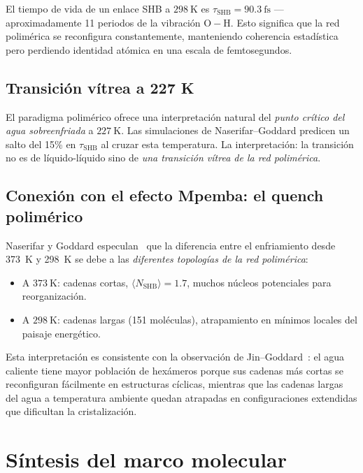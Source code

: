 \noindent El tiempo de vida de un enlace SHB a $\SI{298}{\kelvin}$ es 
$\tau_{\mathrm{SHB}} = \SI{90.3}{\femto\second}$ ---aproximadamente 11 periodos 
de la vibración $\mathrm{O{-}H}$. Esto significa que la red polimérica se 
reconfigura constantemente, manteniendo coherencia estadística pero perdiendo 
identidad atómica en una escala de femtosegundos.

\subsection{Transición vítrea a 227 K}

El paradigma polimérico ofrece una interpretación natural del \emph{punto 
crítico del agua sobreenfriada} a $\SI{227}{\kelvin}$. Las simulaciones de 
Naserifar--Goddard predicen un salto del 15\% en $\tau_{\mathrm{SHB}}$ al cruzar 
esta temperatura. La interpretación: la transición no es de líquido-líquido sino 
de \emph{una transición vítrea de la red polimérica}.

\subsection{Conexión con el efecto Mpemba: el quench polimérico}

Naserifar y Goddard especulan~\cite{naserifar2019} que la diferencia entre el 
enfriamiento desde \SI{373}{\kelvin} y \SI{298}{\kelvin} se debe a las 
\emph{diferentes topologías de la red polimérica}:

\begin{itemize}
\item A $\SI{373}{\kelvin}$: cadenas cortas, $\langle N_{\mathrm{SHB}} \rangle = 1.7$, 
muchos núcleos potenciales para reorganización.
\item A $\SI{298}{\kelvin}$: cadenas largas (\SI{151}{} moléculas), atrapamiento 
en mínimos locales del paisaje energético.
\end{itemize}

\noindent Esta interpretación es consistente con la observación de 
Jin--Goddard~\cite{jin_goddard2015}: el agua caliente tiene mayor población de 
hexámeros porque sus cadenas más cortas se reconfiguran fácilmente en estructuras 
cíclicas, mientras que las cadenas largas del agua a temperatura ambiente quedan 
atrapadas en configuraciones extendidas que dificultan la cristalización.

\section{Síntesis del marco molecular}

